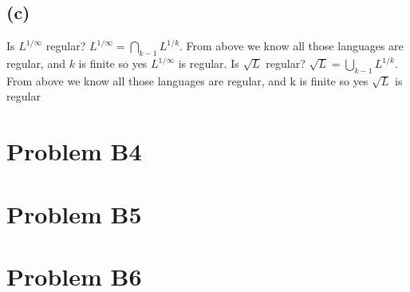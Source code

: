 \documentclass[12pt]{article}
\begin{document}
\subsection*{(c)}
Is $L^{1/\infty}$ regular? $L^{1/\infty} = \bigcap_{k-1}L^{1/k}$.
From above we know all those languages are regular, and $k$ is finite so
yes $L^{1/\infty}$ is regular.
\newline
Is $\sqrt{L}$ regular? $\sqrt{L} = \bigcup_{k-1}L^{1/k}$.
From above we know all those languages are regular,
and k is finite so yes $\sqrt{L}$ is regular

\section*{Problem B4}

\section*{Problem B5}

\section*{Problem B6}
\end{document}
